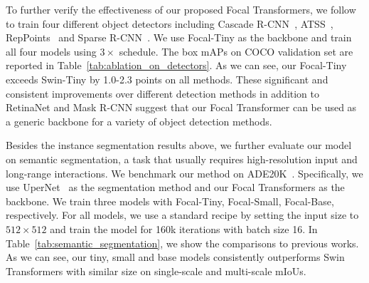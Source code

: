 \documentclass{article}
\begin{document}
To further verify the effectiveness of our proposed Focal Transformers, we follow~\cite{liu2021swin} to train four different object detectors including Cascade R-CNN~\cite{cai2018cascade}, ATSS~\cite{zhang2020bridging}, RepPoints~\cite{yang2019reppoints} and Sparse R-CNN~\cite{sun2020sparse}. We use Focal-Tiny as the backbone and train all four models using $3\times$ schedule. The box mAPs on COCO validation set are reported in Table~\ref{tab:ablation_on_detectors}. As we can see, our Focal-Tiny exceeds Swin-Tiny by 1.0-2.3 points on all methods. These significant and consistent improvements over different detection methods in addition to RetinaNet and Mask R-CNN suggest that our Focal Transformer can be used as a generic backbone for a variety of object detection methods.

Besides the instance segmentation results above, we further evaluate our model on semantic segmentation, a task that usually requires high-resolution input and long-range interactions. We benchmark our method on ADE20K~\cite{zhou2017scene}. Specifically, we use UperNet~\cite{xiao2018unified} as the segmentation method and our Focal Transformers as the backbone. We train three models with Focal-Tiny, Focal-Small, Focal-Base, respectively. For all models, we use a standard recipe by setting the input size to $512 \times 512$ and train the model for 160k iterations with batch size 16. In Table~\ref{tab:semantic_segmentation}, we show the comparisons to previous works. As we can see, our tiny, small and base models consistently outperforms Swin Transformers with similar size on single-scale and multi-scale mIoUs. 
\end{document}
